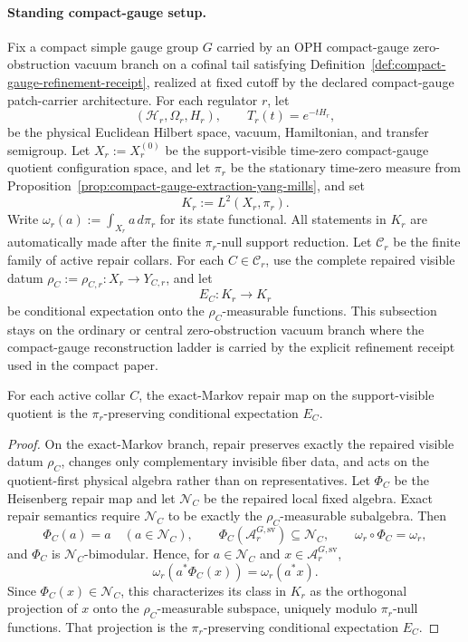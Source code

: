 \paragraph{Standing compact-gauge setup.}
Fix a compact simple gauge group \(G\) carried by an OPH compact-gauge zero-obstruction vacuum
branch on a cofinal tail satisfying Definition~\ref{def:compact-gauge-refinement-receipt}, realized
at fixed cutoff by the declared compact-gauge patch-carrier architecture. For
each regulator \(r\), let
\[
(\mathcal H_r,\Omega_r,H_r),\qquad T_r(t)=e^{-tH_r},
\]
be the physical Euclidean Hilbert space, vacuum, Hamiltonian, and transfer semigroup. Let
\(X_r:=X_r^{(0)}\) be the support-visible time-zero compact-gauge quotient configuration space,
and let \(\pi_r\) be the stationary time-zero measure from
Proposition~\ref{prop:compact-gauge-extraction-yang-mills}, and set
\[
K_r:=L^2(X_r,\pi_r).
\]
Write \(\omega_r(a):=\int_{X_r}a\,d\pi_r\) for its state functional. All statements in \(K_r\)
are automatically made after the finite \(\pi_r\)-null support reduction.
Let \(\mathcal C_r\) be the finite family of active repair collars. For each
\(C\in\mathcal C_r\), use the complete repaired visible datum
\(\rho_C:=\rho_{C,r}:X_r\to Y_{C,r}\), and let
\[
E_C:K_r\to K_r
\]
be conditional expectation onto the \(\rho_C\)-measurable functions. This subsection stays on the
ordinary or central zero-obstruction vacuum branch where the compact-gauge reconstruction ladder is
carried by the explicit refinement receipt used in the compact paper.

\begin{proposition}
\label{prop:sv-repair-expectation}
For each active collar \(C\), the exact-Markov repair map on the support-visible quotient is the
\(\pi_r\)-preserving conditional expectation \(E_C\).
\end{proposition}

\begin{proof}
On the exact-Markov branch, repair preserves exactly the repaired visible datum \(\rho_C\), changes
only complementary invisible fiber data, and acts on the quotient-first physical algebra rather
than on representatives. Let \(\Phi_C\) be the Heisenberg repair map and let \(\mathcal N_C\) be
the repaired local fixed algebra. Exact repair semantics require
\(\mathcal N_C\) to be exactly the \(\rho_C\)-measurable subalgebra. Then
\[
\Phi_C(a)=a\quad(a\in\mathcal N_C),\qquad
\Phi_C(\mathcal A_r^{G,\mathrm{sv}})\subseteq\mathcal N_C,\qquad
\omega_r\circ\Phi_C=\omega_r,
\]
and \(\Phi_C\) is \(\mathcal N_C\)-bimodular. Hence, for
\(a\in\mathcal N_C\) and \(x\in\mathcal A_r^{G,\mathrm{sv}}\),
\[
\omega_r\!\left(a^*\Phi_C(x)\right)=\omega_r(a^*x).
\]
Since \(\Phi_C(x)\in\mathcal N_C\), this characterizes its class in \(K_r\) as the orthogonal
projection of \(x\) onto the \(\rho_C\)-measurable subspace, uniquely modulo \(\pi_r\)-null
functions. That projection is the \(\pi_r\)-preserving conditional expectation \(E_C\).
\end{proof}

